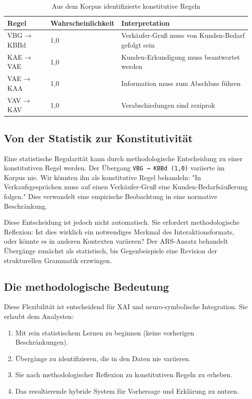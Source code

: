 \documentclass[12pt,a4paper]{article}
\begin{document}
\begin{table}[H]
\centering
\caption{Aus dem Korpus identifizierte konstitutive Regeln}
\label{tab:constitutive}
\begin{tabular}{@{} l l l @{}}
\toprule
\textbf{Regel} & \textbf{Wahrscheinlichkeit} & \textbf{Interpretation} \\
\midrule
VBG → KBBd & 1,0 & Verkäufer-Gruß muss von Kunden-Bedarf gefolgt sein \\
KAE → VAE & 1,0 & Kunden-Erkundigung muss beantwortet werden \\
VAE → KAA & 1,0 & Information muss zum Abschluss führen \\
VAV → KAV & 1,0 & Verabschiedungen sind reziprok \\
\bottomrule
\end{tabular}
\end{table}

\subsection{Von der Statistik zur Konstitutivität}

Eine statistische Regularität kann durch methodologische Entscheidung zu einer
konstitutiven Regel werden. Der Übergang \texttt{VBG → KBBd (1,0)} variierte
im Korpus nie. Wir könnten ihn als konstitutive Regel behandeln: "In
Verkaufsgesprächen muss auf einen Verkäufer-Gruß eine Kunden-Bedarfsäußerung
folgen." Dies verwandelt eine empirische Beobachtung in eine normative
Beschränkung.

Diese Entscheidung ist jedoch nicht automatisch. Sie erfordert methodologische
Reflexion: Ist dies wirklich ein notwendiges Merkmal des Interaktionsformats,
oder könnte es in anderen Kontexten variieren? Der ARS-Ansatz behandelt
Übergänge zunächst als statistisch, bis Gegenbeispiele eine Revision der
strukturellen Grammatik erzwingen.

\subsection{Die methodologische Bedeutung}

Diese Flexibilität ist entscheidend für XAI und neuro-symbolische Integration.
Sie erlaubt dem Analysten:

\begin{enumerate}
    \item Mit rein statistischem Lernen zu beginnen (keine vorherigen
    Beschränkungen).
    \item Übergänge zu identifizieren, die in den Daten nie variieren.
    \item Sie nach methodologischer Reflexion zu konstitutiven Regeln zu erheben.
    \item Das resultierende hybride System für Vorhersage und Erklärung zu
    nutzen.
\end{enumerate}
\end{document}

